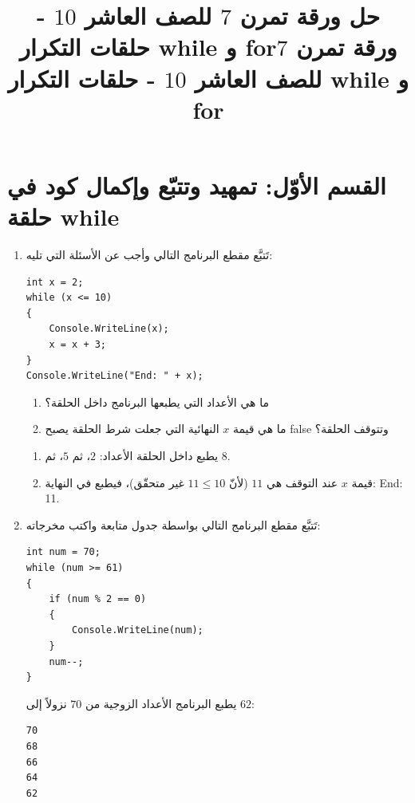 \documentclass[14pt]{extarticle}
\title{حل ورقة تمرن $7$ للصف العاشر $10$ - حلقات التكرار \textenglish{while} و \textenglish{for}}
\title{ورقة تمرن $7$ للصف العاشر $10$ - حلقات التكرار \textenglish{while} و \textenglish{for}}
\begin{document}
\maketitle
\thispagestyle{fancy}

\section*{القسم الأوّل: تمهيد وتتبّع وإكمال كود في حلقة \textenglish{while}}

\begin{enumerate}[itemsep=2em]

\item تَتبَّع مقطع البرنامج التالي وأجب عن الأسئلة التي تليه:
\begin{boxCode}
\begin{english}
\begin{verbatim}
int x = 2;
while (x <= 10)
{
    Console.WriteLine(x);
    x = x + 3;
}
Console.WriteLine("End: " + x);
\end{verbatim}
\end{english}
\end{boxCode}
\begin{enumerate}
    \item ما هي الأعداد التي يطبعها البرنامج داخل الحلقة؟
    \item ما هي قيمة $x$ النهائية التي جعلت شرط الحلقة يصبح \textenglish{false} وتتوقف الحلقة؟
\end{enumerate}
\ifwithsols
\begin{boxSolution}
\begin{enumerate}
    \item يطبع داخل الحلقة الأعداد: $2$، ثم $5$، ثم $8$.
    \item قيمة $x$ عند التوقف هي $11$ (لأنّ $11 \le 10$ غير متحقّق)، فيطبع في النهاية: \textenglish{End: 11}.
\end{enumerate}
\end{boxSolution}
\fi
\filbreak

\item تَتبَّع مقطع البرنامج التالي بواسطة جدول متابعة واكتب مخرجاته:
\begin{boxCode}
\begin{english}
\begin{verbatim}
int num = 70;
while (num >= 61)
{
    if (num % 2 == 0)
    {
        Console.WriteLine(num);
    }
    num--;
}
\end{verbatim}
\end{english}
\end{boxCode}
\ifwithsols
\begin{boxSolution}
يطبع البرنامج الأعداد الزوجية من $70$ نزولاً إلى $62$:
\begin{english}
\begin{verbatim}
70
68
66
64
62
\end{verbatim}
\end{english}
\end{boxSolution}
\fi
\filbreak


\end{enumerate}
\end{document}
